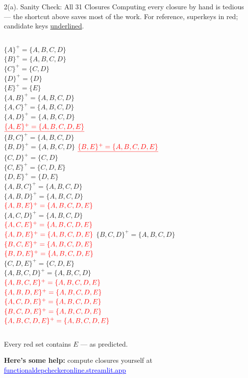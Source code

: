 \documentclass{beamer}
\begin{document}
\begin{frame}{2(a). Sanity Check: All 31 Closures}
\scriptsize
Computing every closure by hand is tedious --- the shortcut above saves most of the work. For reference, superkeys in \alert{red}; candidate keys \underline{underlined}.
\medskip

\begin{columns}[t,onlytextwidth]
\tiny
{}
$\{A\}^+ = \{A,B,C,D\}$\\
$\{B\}^+ = \{A,B,C,D\}$\\
$\{C\}^+ = \{C,D\}$\\
$\{D\}^+ = \{D\}$\\
$\{E\}^+ = \{E\}$\\
$\{A,B\}^+ = \{A,B,C,D\}$\\
$\{A,C\}^+ = \{A,B,C,D\}$\\
$\{A,D\}^+ = \{A,B,C,D\}$\\
$\textcolor{red}{\underline{\{A,E\}^+ = \{A,B,C,D,E\}}}$\\
$\{B,C\}^+ = \{A,B,C,D\}$\\
$\{B,D\}^+ = \{A,B,C,D\}$
$\textcolor{red}{\underline{\{B,E\}^+ = \{A,B,C,D,E\}}}$\\
$\{C,D\}^+ = \{C,D\}$\\
$\{C,E\}^+ = \{C,D,E\}$\\
$\{D,E\}^+ = \{D,E\}$\\
$\{A,B,C\}^+ = \{A,B,C,D\}$\\
$\{A,B,D\}^+ = \{A,B,C,D\}$\\
$\textcolor{red}{\{A,B,E\}^+ = \{A,B,C,D,E\}}$\\
$\{A,C,D\}^+ = \{A,B,C,D\}$\\
$\textcolor{red}{\{A,C,E\}^+ = \{A,B,C,D,E\}}$\\
$\textcolor{red}{\{A,D,E\}^+ = \{A,B,C,D,E\}}$
$\{B,C,D\}^+ = \{A,B,C,D\}$\\
$\textcolor{red}{\{B,C,E\}^+ = \{A,B,C,D,E\}}$\\
$\textcolor{red}{\{B,D,E\}^+ = \{A,B,C,D,E\}}$\\
$\{C,D,E\}^+ = \{C,D,E\}$\\
$\{A,B,C,D\}^+ = \{A,B,C,D\}$\\
$\textcolor{red}{\{A,B,C,E\}^+ = \{A,B,C,D,E\}}$\\
$\textcolor{red}{\{A,B,D,E\}^+ = \{A,B,C,D,E\}}$\\
$\textcolor{red}{\{A,C,D,E\}^+ = \{A,B,C,D,E\}}$\\
$\textcolor{red}{\{B,C,D,E\}^+ = \{A,B,C,D,E\}}$\\
$\textcolor{red}{\{A,B,C,D,E\}^+ = \{A,B,C,D,E\}}$
\end{columns}
\medskip
Every red set contains $E$ --- as predicted.
\medskip

\footnotesize
\textbf{Here's some help:} compute closures yourself at \href{https://functionaldepcheckeronline.streamlit.app/}{\textcolor{blue}{\underline{functionaldepcheckeronline.streamlit.app}}}
\end{frame}
\end{document}
